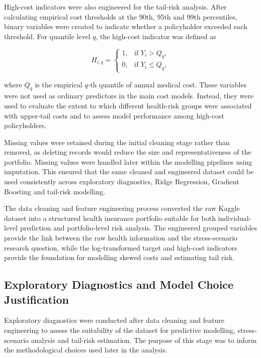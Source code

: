 \documentclass[11pt]{article}
\begin{document}
	High-cost indicators were also engineered for the tail-risk analysis. After calculating empirical cost thresholds at the 90th, 95th and 99th percentiles, binary variables were created to indicate whether a policyholder exceeded each threshold. For quantile level \(q\), the high-cost indicator was defined as
	
	\begin{equation}
		H_{i,q} =
		\left\{
		\begin{array}{ll}
			1, & \mbox{if } Y_i > Q_q, \\
			0, & \mbox{if } Y_i \leq Q_q,
		\end{array}
		\right.
	\end{equation}
	
	where \(Q_q\) is the empirical \(q\)-th quantile of annual medical cost. These variables were not used as ordinary predictors in the main cost models. Instead, they were used to evaluate the extent to which different health-risk groups were associated with upper-tail costs and to assess model performance among high-cost policyholders.
	
	Missing values were retained during the initial cleaning stage rather than removed, as deleting records would reduce the size and representativeness of the portfolio. Missing values were handled later within the modelling pipelines using imputation. This ensured that the same cleaned and engineered dataset could be used consistently across exploratory diagnostics, Ridge Regression, Gradient Boosting and tail-risk modelling.
	
	The data cleaning and feature engineering process converted the raw Kaggle dataset into a structured health insurance portfolio suitable for both individual-level prediction and portfolio-level risk analysis. The engineered grouped variables provide the link between the raw health information and the stress-scenario research question, while the log-transformed target and high-cost indicators provide the foundation for modelling skewed costs and estimating tail risk.
	
	\subsection{Exploratory Diagnostics and Model Choice Justification}
	
	Exploratory diagnostics were conducted after data cleaning and feature engineering to assess the suitability of the dataset for predictive modelling, stress-scenario analysis and tail-risk estimation. The purpose of this stage was to inform the methodological choices used later in the analysis.
	
\end{document}
